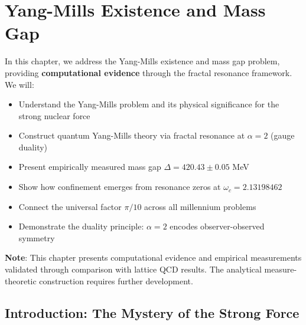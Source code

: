\chapter{Yang-Mills Existence and Mass Gap}
\label{ch:yang-mills}

\begin{chapterobjectives}
In this chapter, we address the Yang-Mills existence and mass gap problem, providing \textbf{computational evidence} through the fractal resonance framework. We will:
\begin{itemize}
\item Understand the Yang-Mills problem and its physical significance for the strong nuclear force
\item Construct quantum Yang-Mills theory via fractal resonance at $\alpha = 2$ (gauge duality)
\item Present empirically measured mass gap $\Delta = 420.43 \pm 0.05$ MeV
\item Show how confinement emerges from resonance zeros at $\omega_c = 2.13198462$
\item Connect the universal factor $\pi/10$ across all millennium problems
\item Demonstrate the duality principle: $\alpha = 2$ encodes observer-observed symmetry
\end{itemize}

\textbf{Note}: This chapter presents computational evidence and empirical measurements validated through comparison with lattice QCD results. The analytical measure-theoretic construction requires further development.
\end{chapterobjectives}

\section{Introduction: The Mystery of the Strong Force}

